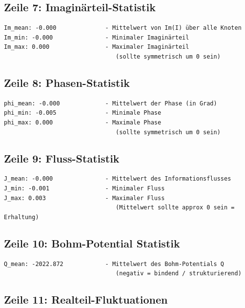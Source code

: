 \subsection{Zeile 7: Imaginärteil-Statistik}

\begin{verbatim}
Im_mean: -0.000              - Mittelwert von Im(I) über alle Knoten
Im_min: -0.000               - Minimaler Imaginärteil
Im_max: 0.000                - Maximaler Imaginärteil
                                (sollte symmetrisch um 0 sein)
\end{verbatim}

\subsection{Zeile 8: Phasen-Statistik}

\begin{verbatim}
phi_mean: -0.000             - Mittelwert der Phase (in Grad)
phi_min: -0.005              - Minimale Phase
phi_max: 0.000               - Maximale Phase
                                (sollte symmetrisch um 0 sein)
\end{verbatim}

\subsection{Zeile 9: Fluss-Statistik}

\begin{verbatim}
J_mean: -0.000               - Mittelwert des Informationsflusses
J_min: -0.001                - Minimaler Fluss
J_max: 0.003                 - Maximaler Fluss
                                (Mittelwert sollte approx 0 sein = Erhaltung)
\end{verbatim}

\subsection{Zeile 10: Bohm-Potential Statistik}

\begin{verbatim}
Q_mean: -2022.872            - Mittelwert des Bohm-Potentials Q
                                (negativ = bindend / strukturierend)
\end{verbatim}

\subsection{Zeile 11: Realteil-Fluktuationen}

